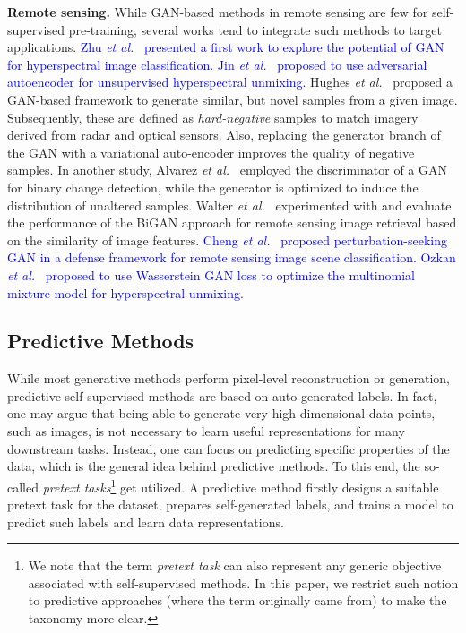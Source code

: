 \documentclass[lettersize,journal]{IEEEtran}
\newcommand{\etal}{\textit{et al.}}
\begin{document}
\textbf{Remote sensing.} While GAN-based methods in remote sensing are few for self-supervised pre-training, several works tend to integrate such methods to target applications.
\textcolor{blue}{Zhu \etal~\cite{zhu2018generative} presented a first work to explore the potential of GAN for hyperspectral image classification. Jin \etal~\cite{jin2021adversarial} proposed to use adversarial autoencoder for unsupervised hyperspectral unmixing.} 
Hughes \etal~\cite{hughes2018mining} proposed a GAN-based framework to generate similar, but novel samples from a given image. Subsequently, these are defined as \textit{hard-negative} samples to match imagery derived from radar and optical sensors. Also, replacing the generator branch of the GAN with a variational auto-encoder improves the quality of negative samples. In another study, Alvarez \etal~\cite{alvarez2020s2} employed the discriminator  of a GAN for binary change detection, while the generator  is optimized to induce the distribution of unaltered samples. Walter \etal~\cite{walter2020self} experimented with and evaluate the performance of the BiGAN approach for remote sensing image retrieval based on the similarity of image features. 
\textcolor{blue}{Cheng \etal~\cite{cheng2021perturbation} proposed perturbation-seeking GAN in a defense framework for remote sensing image scene classification. Ozkan \etal~\cite{ozkan2020spectral} proposed to use Wasserstein GAN loss to optimize the multinomial mixture
model for hyperspectral unmixing.}


\subsection{Predictive Methods}

While most generative methods perform pixel-level reconstruction or generation, predictive self-supervised methods are based on auto-generated labels. In fact, one may argue that being able to generate very high dimensional data points, such as images, is not necessary to learn useful representations for many downstream tasks. Instead, one can focus on predicting specific properties of the data, which is the general idea behind predictive methods. To this end, the so-called \textit{pretext tasks}\footnote{We note that the term \textit{pretext task} can also represent any generic objective associated with self-supervised methods. In this paper, we restrict such notion to predictive approaches (where the term originally came from) to make the taxonomy more clear.} get utilized. A predictive method firstly designs a suitable pretext task for the dataset, prepares self-generated labels, and trains a model to predict such labels and learn data representations.
\end{document}
